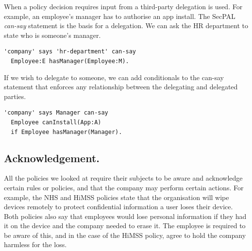 \documentclass[thesis.tex]{subfiles}
\begin{document}
When a policy decision requires input from a third-party delegation is used.
For example, an employee's manager has to authorise an app install.
The SecPAL \emph{can-say} statement is the basis for a delegation.
We can ask the HR department to state who is someone's manager.
\begin{lstlisting}
'company' says 'hr-department' can-say
  Employee:E hasManager(Employee:M).
\end{lstlisting}
If we wish to delegate to someone, we can add conditionals to the can-say statement that enforces any relationship between the delegating and delegated parties.
\begin{lstlisting}
'company' says Manager can-say
  Employee canInstall(App:A)
  if Employee hasManager(Manager).
\end{lstlisting}

\subsection{Acknowledgement.}

All the policies we looked at require their subjects to be aware and acknowledge certain rules or policies,
  and that the company may perform certain actions.
For example, the NHS and \ac{HiMSS} policies state that the organisation will wipe devices remotely to protect confidential information a user loses their device.
Both policies also say that employees would lose personal information if they had it on the device and the company needed to erase it.
The employee is required to be aware of this, and in the case of the \ac{HiMSS} policy, agree to hold the company harmless for the loss.
\end{document}
